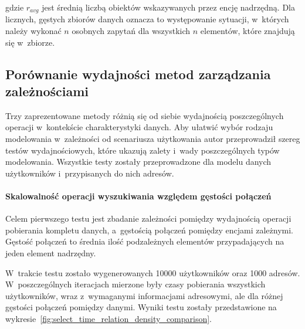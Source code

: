 gdzie $r_{avg}$ jest średnią liczbą obiektów wskazywanych przez encję nadrzędną. Dla licznych, gęstych zbiorów danych oznacza to występowanie sytuacji, w~których należy wykonać $n$ osobnych zapytań dla wszystkich $n$ elementów, które znajdują się w~zbiorze.

\subsection{Porównanie wydajności metod zarządzania zależnościami}

Trzy zaprezentowane metody różnią się od siebie wydajnością poszczególnych operacji w~kontekście charakterystyki danych. Aby ułatwić wybór rodzaju modelowania w~zależności od scenariusza użytkowania autor przeprowadził szereg testów wydajnościowych, które ukazują zalety i~wady poszczególnych typów modelowania. Wszystkie testy zostały przeprowadzone dla modelu danych użytkowników i~przypisanych do nich adresów.

\paragraph{Skalowalność operacji wyszukiwania względem gęstości połączeń} 

Celem pierwszego testu jest zbadanie zależności pomiędzy wydajnością operacji pobierania kompletu danych, a~gęstością połączeń pomiędzy encjami zależnymi. Gęstość połączeń to średnia ilość podzależnych elementów przypadających na jeden element nadrzędny. 

W~trakcie testu zostało wygenerowanych 10000 użytkowników oraz 1000 adresów. W~poszczególnych iteracjach mierzone były czasy pobierania wszystkich użytkowników, wraz z~wymaganymi informacjami adresowymi, ale dla różnej gęstości połączeń pomiędzy danymi. Wyniki testu zostały przedstawione na wykresie~\ref{fig:select_time_relation_density_comparison}.

